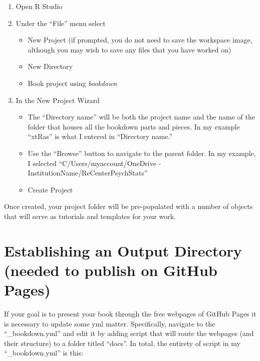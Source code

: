 \documentclass[
]{book}
\providecommand{\tightlist}{%
  \setlength{\itemsep}{0pt}\setlength{\parskip}{0pt}}
\begin{document}
\begin{enumerate}
\def\labelenumi{\arabic{enumi}.}
\tightlist
\item
  Open R Studio
\item
  Under the ``File'' menu select

  \begin{itemize}
  \tightlist
  \item
    New Project (if prompted, you do not need to save the workspace image, although you may wish to save any files that you have worked on)
  \item
    New Directory
  \item
    Book project using \emph{bookdown}
  \end{itemize}
\item
  In the New Project Wizard

  \begin{itemize}
  \tightlist
  \item
    The ``Directory name'' will be both the project name and the name of the folder that houses all the bookdown parts and pieces. In my example ``xtRas'' is what I entered in ``Directory name.''
  \item
    Use the ``Browse'' button to navigate to the parent folder. In my example, I selected ``C/Users/myaccount/OneDrive - InstitutionName/ReCenterPsychStats''
  \item
    Create Project
  \end{itemize}
\end{enumerate}

Once created, your project folder will be pre-populated with a number of objects that will serve as tutorials and templates for your work.

\hypertarget{establishing-an-output-directory-needed-to-publish-on-github-pages}{%
\section{Establishing an Output Directory (needed to publish on GitHub Pages)}\label{establishing-an-output-directory-needed-to-publish-on-github-pages}}

If your goal is to present your book through the free webpages of GitHub Pages it is necessary to update some yml matter. Specifically, navigate to the ``\_bookdown.yml'' and edit it by adding script that will route the webpages (and their structure) to a folder titled ``docs''. In total, the entirety of script in my ``\_bookdown.yml'' is this:
\end{document}
